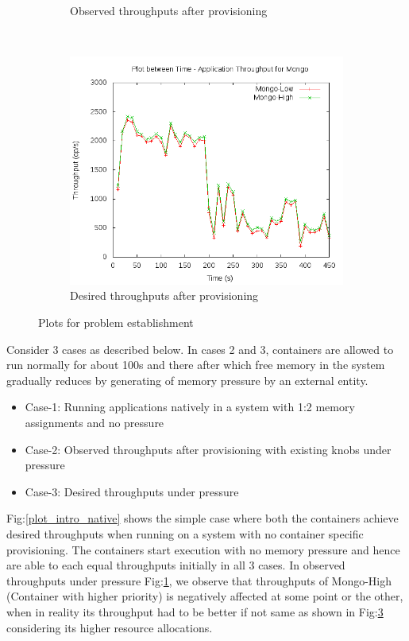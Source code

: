 \begin{figure}[t!]
\begin{subfigure}[t]{0.48\textwidth}
	    \caption{Observed throughputs after provisioning}
	    \label{plot_intro_observed}
	  \end{subfigure}
	  ~ 
	  \begin{subfigure}[t]{0.48\textwidth}
	    \centering
	    \includegraphics[width=1\textwidth]{images/intro/desired.png}
	    \caption{Desired throughputs after provisioning}
	    \label{plot_intro_desired}
	  \end{subfigure}
	  \caption{Plots for problem establishment}
	\end{figure}
	
	Consider 3 cases as described below. In cases 2 and 3, containers are allowed to run normally for about 100s and there after 
which free memory in the system gradually reduces by generating of memory pressure by an external entity. 
	
	\begin{itemize}
	  \item Case-1: Running applications natively in a system with 1:2 memory assignments and no pressure 
	  \item Case-2: Observed throughputs after provisioning with existing knobs under pressure
	  \item Case-3: Desired throughputs under pressure
	\end{itemize}
	
	Fig:\ref{plot_intro_native} shows the simple case where both the containers achieve desired throughputs when running on a system 
with no container specific provisioning. The containers start execution with no memory pressure and hence are able to each equal 
throughputs initially in all 3 cases. In observed throughputs under pressure Fig:\ref{plot_intro_observed}, we observe that throughputs of 
Mongo-High (Container with higher priority) is negatively affected at some point or the other, when in reality its throughput had to be 
better if not same as shown in Fig:\ref{plot_intro_desired} considering its higher resource allocations. 
	
